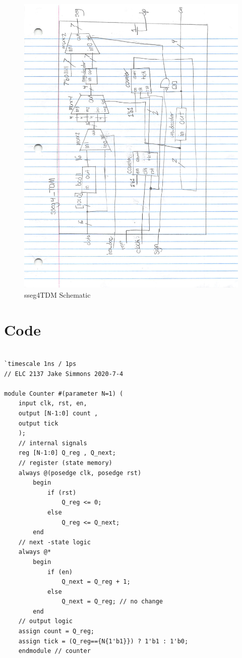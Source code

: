 \documentclass[11pt]{article}
\begin{document}
\begin{figure}[ht]\centering
	\includegraphics[width=1.15 \textwidth]{sseg4_TDM_Schematic.pdf}
	\caption{sseg4TDM Schematic}
	\label{fig:sim_with_table}
\end{figure}

\clearpage
\section*{Code}

\begin{lstlisting}[style=Verilog,
caption=Counter Module,
label=counter 
]

`timescale 1ns / 1ps
// ELC 2137 Jake Simmons 2020-7-4

module Counter #(parameter N=1) ( 
	input clk, rst, en, 
	output [N-1:0] count , 
	output tick 
	);
	// internal signals 
	reg [N-1:0] Q_reg , Q_next;
	// register (state memory) 
	always @(posedge clk, posedge rst) 
		begin 
			if (rst) 
				Q_reg <= 0; 
			else 
				Q_reg <= Q_next; 
		end
	// next -state logic 
	always @* 
		begin 
			if (en) 
				Q_next = Q_reg + 1; 
			else 
				Q_next = Q_reg; // no change 
		end
	// output logic 
	assign count = Q_reg; 
	assign tick = (Q_reg=={N{1'b1}}) ? 1'b1 : 1'b0;
	endmodule // counter
\end{lstlisting}
\end{document}
